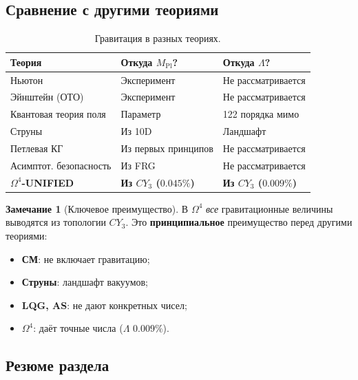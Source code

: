 \documentclass[11pt,a4paper]{article}
\newcommand{\CY}{CY_3}
\newcommand{\Om}{\Omega^4}
\newcommand{\Mpl}{M_{\text{Pl}}}
\theoremstyle{definition}
\newtheorem{remark}[theorem]{Замечание}
\begin{document}
\subsection{Сравнение с другими теориями}
\label{subsec:gravity-comparison}

\begin{table}[htbp]
\centering
\caption{Гравитация в разных теориях.}
\label{tab:gravity-comparison}
\begin{tabular}{p{3.5cm}p{5cm}p{5cm}}
\toprule
Теория & Откуда $\Mpl$? & Откуда $\Lambda$? \\
\midrule
Ньютон & Эксперимент & Не рассматривается \\[0.3em]
Эйнштейн (ОТО) & Эксперимент & Не рассматривается \\[0.3em]
Квантовая теория поля & Параметр & 122 порядка мимо \\[0.3em]
Струны & Из 10D & Ландшафт \\[0.3em]
Петлевая КГ & Из первых принципов & Не рассматривается \\[0.3em]
Асимптот. безопасность & Из FRG & Не рассматривается \\[0.3em]
\textbf{$\Om$-UNIFIED} & 
    \textbf{Из $\CY$ ($0.045\%$)} & 
    \textbf{Из $\CY$ ($0.009\%$)} \\
\bottomrule
\end{tabular}
\end{table}

\begin{remark}[Ключевое преимущество]
\label{rem:gravity-advantage}
В $\Om$ \emph{все} гравитационные величины выводятся из 
топологии $\CY$. Это \textbf{принципиальное} преимущество 
перед другими теориями:
\begin{itemize}
    \item \textbf{СМ}: не включает гравитацию;
    \item \textbf{Струны}: ландшафт вакуумов;
    \item \textbf{LQG, AS}: не дают конкретных чисел;
    \item \textbf{$\Om$}: даёт точные числа ($\Lambda$ $0.009\%$).
\end{itemize}
\end{remark}

\subsection{Резюме раздела}
\label{subsec:gravity-summary}
\end{document}
